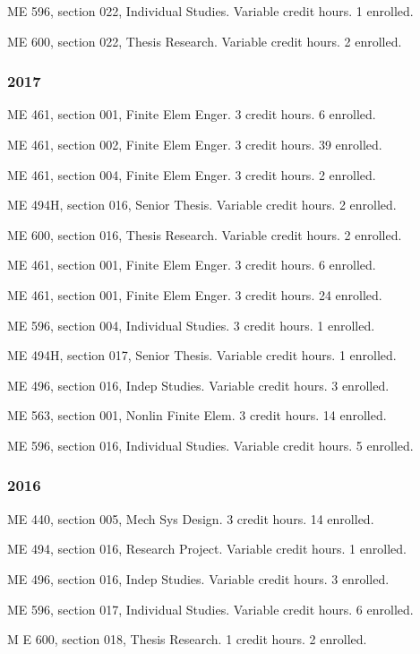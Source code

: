 \documentclass[
]{article}
\begin{document}
ME 596, section 022, Individual Studies. Variable credit hours. 1
enrolled.

ME 600, section 022, Thesis Research. Variable credit hours. 2 enrolled.

\subsubsection{2017}\label{section-7}

ME 461, section 001, Finite Elem Enger. 3 credit hours. 6 enrolled.

ME 461, section 002, Finite Elem Enger. 3 credit hours. 39 enrolled.

ME 461, section 004, Finite Elem Enger. 3 credit hours. 2 enrolled.

ME 494H, section 016, Senior Thesis. Variable credit hours. 2 enrolled.

ME 600, section 016, Thesis Research. Variable credit hours. 2 enrolled.

ME 461, section 001, Finite Elem Enger. 3 credit hours. 6 enrolled.

ME 461, section 001, Finite Elem Enger. 3 credit hours. 24 enrolled.

ME 596, section 004, Individual Studies. 3 credit hours. 1 enrolled.

ME 494H, section 017, Senior Thesis. Variable credit hours. 1 enrolled.

ME 496, section 016, Indep Studies. Variable credit hours. 3 enrolled.

ME 563, section 001, Nonlin Finite Elem. 3 credit hours. 14 enrolled.

ME 596, section 016, Individual Studies. Variable credit hours. 5
enrolled.

\subsubsection{2016}\label{section-8}

ME 440, section 005, Mech Sys Design. 3 credit hours. 14 enrolled.

ME 494, section 016, Research Project. Variable credit hours. 1
enrolled.

ME 496, section 016, Indep Studies. Variable credit hours. 3 enrolled.

ME 596, section 017, Individual Studies. Variable credit hours. 6
enrolled.

M E 600, section 018, Thesis Research. 1 credit hours. 2 enrolled.
\end{document}
